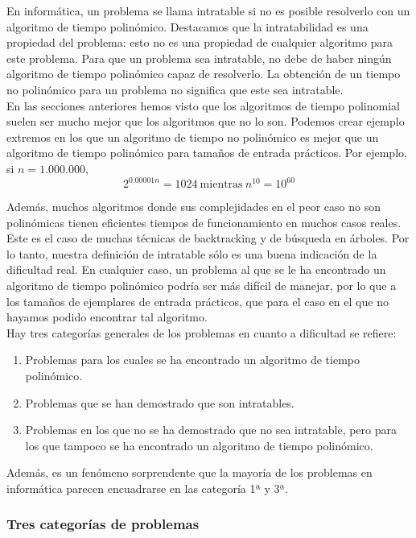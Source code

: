 En informática, un problema se llama intratable si no es posible resolverlo con un algoritmo de tiempo polinómico. Destacamos que la intratabilidad es una propiedad del problema: esto no es una propiedad de cualquier algoritmo para este problema. Para que un problema sea intratable, no debe de haber ningún algoritmo de tiempo polinómico capaz de resolverlo. La obtención de un tiempo no polinómico para un problema no significa que este sea intratable.\\

En las secciones anteriores hemos visto que los algoritmos de tiempo polinomial suelen ser mucho mejor que los algoritmos que no lo son. Podemos crear ejemplo extremos en los que un algoritmo de tiempo no polinómico es mejor que un algoritmo de tiempo polinómico para tamaños de entrada prácticos. Por ejemplo, si $n = 1{.}000{.}000$,\\
\[ 2^{0.00001n} = 1024\ \mbox{mientras}\ n^{10} = 10^{60} \]

Además, muchos algoritmos donde sus complejidades en el peor caso no son polinómicas tienen eficientes tiempos de funcionamiento en muchos casos reales. Este es el caso de muchas técnicas de backtracking y de búsqueda en árboles. Por lo tanto, nuestra definición de intratable sólo es una buena indicación de la dificultad real. En cualquier caso, un problema al que se le ha encontrado un algoritmo de tiempo polinómico podría ser más difícil de manejar, por lo que a los tamaños de ejemplares de entrada prácticos, que para el caso en el que no hayamos podido encontrar tal algoritmo. \\

Hay tres categorías generales de los problemas en cuanto a dificultad se refiere:
\begin{enumerate}
\item Problemas para los cuales se ha encontrado un algoritmo de tiempo polinómico.
\item Problemas que se han demostrado que son intratables.
\item Problemas en los que no se ha demostrado que no sea intratable, pero para los que tampoco se ha encontrado un algoritmo de tiempo polinómico.
\end{enumerate}

Además, es un fenómeno sorprendente que la mayoría de los problemas en informática parecen encuadrarse en las categoría 1ª y 3ª.\\

\subsubsection{Tres categorías de problemas}

